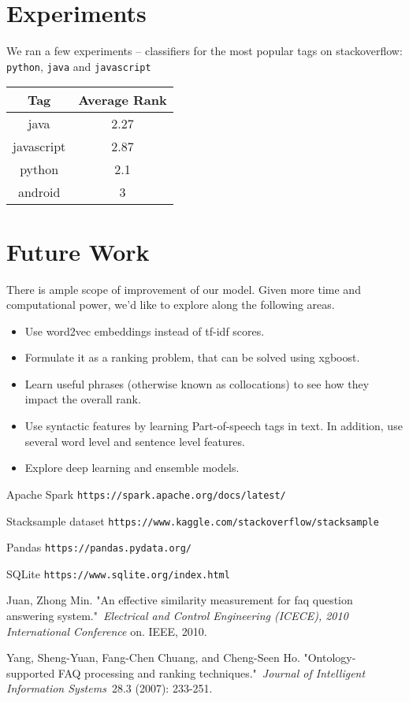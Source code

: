 \documentclass{article}
\begin{document}
\section{Experiments}
We ran a few experiments -- classifiers for the most popular tags  on stackoverflow: \texttt{python}, \texttt{java} and \texttt{javascript}

\begin{center}
	\begin{tabular}
		{|c c|} 
		\hline
		Tag & Average Rank\\ 
		\hline\hline
		java & 2.27 \\ 
		\hline
		javascript & 2.87 \\
		\hline
		python & 2.1 \\
		\hline
		android & 3 \\
		\hline
	\end{tabular}
\end{center}


\section{Future Work}
There is ample scope of improvement of our model. Given more time and computational power, we'd like to explore along the following areas.

\begin{itemize}
	\item Use word2vec embeddings instead of tf-idf scores.
	\item Formulate it as a ranking problem, that can be solved using xgboost.
	\item Learn useful phrases (otherwise known as collocations) to see how they impact the overall rank.
	\item Use syntactic features by learning Part-of-speech tags in text. In addition, use several word level and sentence level features.
	\item Explore deep learning and ensemble models.
\end{itemize}


\begin{thebibliography}{1}
	
	 Apache Spark \texttt{https://spark.apache.org/docs/latest/}
	
	 Stacksample dataset \texttt{https://www.kaggle.com/stackoverflow/stacksample}
	
	 Pandas \texttt{https://pandas.pydata.org/} 
	
	 SQLite \texttt{https://www.sqlite.org/index.html}
	
	 Juan, Zhong Min. "An effective similarity measurement for faq question answering system." \textit{Electrical and Control Engineering (ICECE), 2010 International Conference} on. IEEE, 2010.
	
	 Yang, Sheng-Yuan, Fang-Chen Chuang, and Cheng-Seen Ho. "Ontology-supported FAQ processing and ranking techniques." \textit{Journal of Intelligent Information Systems} 28.3 (2007): 233-251.
	
\end{thebibliography}
\end{document}
